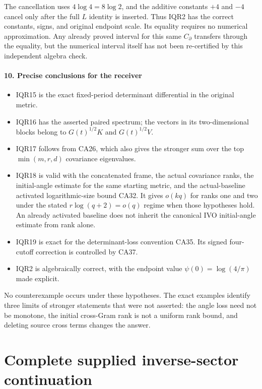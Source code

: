 \documentclass[11pt]{article}
\begin{document}
The cancellation uses \(4\log4=8\log2\), and the additive constants \(+4\) and \(-4\) cancel only after the full \(L\) identity is inserted. Thus IQR2 has the correct constants, signs, and original endpoint scale. Its equality requires no numerical approximation. Any already proved interval for this same \(C_\partial\) transfers through the equality, but the numerical interval itself has not been re-certified by this independent algebra check.

\subsection{10. Precise conclusions for the receiver}\label{precise-conclusions-for-the-receiver}

\begin{itemize}
\tightlist
\item
  IQR15 is the exact fixed-period determinant differential in the original metric.
\item
  IQR16 has the asserted paired spectrum; the vectors in its two-dimensional blocks belong to \(G(t)^{1/2}K\) and \(G(t)^{1/2}V\).
\item
  IQR17 follows from CA26, which also gives the stronger sum over the top \(\min(m,r,d)\) covariance eigenvalues.
\item
  IQR18 is valid with the concatenated frame, the actual covariance ranks, the initial-angle estimate for the same starting metric, and the actual-baseline activated logarithmic-size bound CA32. It gives \(o(kq)\) for ranks one and two under the stated \(r\log(q+2)=o(q)\) regime when those hypotheses hold. An already activated baseline does not inherit the canonical IVO initial-angle estimate from rank alone.
\item
  IQR19 is exact for the determinant-loss convention CA35. Its signed four-cutoff correction is controlled by CA37.
\item
  IQR2 is algebraically correct, with the endpoint value \(\psi(0)=\log(4/\pi)\) made explicit.
\end{itemize}

No counterexample occurs under these hypotheses. The exact examples identify three limits of stronger statements that were not asserted: the angle loss need not be monotone, the initial cross-Gram rank is not a uniform rank bound, and deleting source cross terms changes the answer.

\clearpage\part{Complete supplied inverse-sector continuation}
\end{document}
